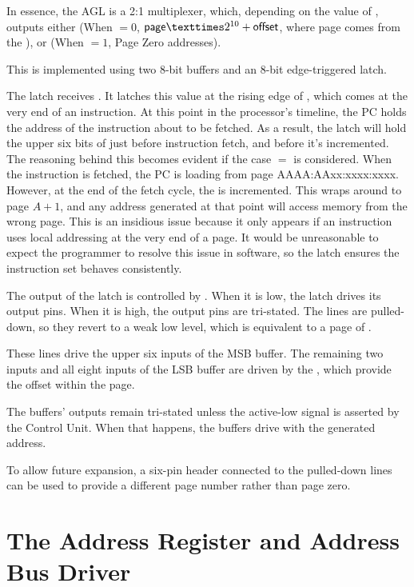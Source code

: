 In essence, the \gls{AGL} is a 2:1 multiplexer, which, depending on the value
of , outputs either  (When $ = 0$,
$\mbox{\textsf{page}} × 2^{10} + \mbox{\textsf{offset}}$, where \textsf{page} comes
from the \PC), or  (When $ = 1$, \gls{Page Zero}
addresses).

This is implemented using two  8-bit buffers and an  8-bit
edge-triggered latch.

The latch receives . It latches this value at the rising edge of
, which comes at the very end of an instruction. At this point in the
processor's timeline, the PC holds the address of the instruction about to be
fetched. As a result, the latch will hold the upper six bits of \PC{} just
before instruction fetch, and before it's incremented. The reasoning behind
this becomes evident if the case \PC$=$ is
considered. When the instruction is fetched, the PC is loading from page
{AAAA:AAxx:xxxx:xxxx}. However, at the end of the fetch cycle, the \PC{} is
incremented. This wraps around to page $A+1$, and any address generated at that
point will access memory from the wrong page. This is an insidious issue
because it only appears if an instruction uses local addressing at the very end
of a page. It would be unreasonable to expect the programmer to resolve this
issue in software, so the latch ensures the instruction set behaves
consistently.

The output of the latch is controlled by . When it is low, the latch
drives its output pins. When it is high, the output pins are tri-stated. The
lines are pulled-down, so they revert to a weak low level, which is equivalent
to a page of .

These lines drive the upper six inputs of the \gls{MSB} buffer. The remaining
two inputs and all eight inputs of the \gls{LSB} buffer are driven by the
, which provide the offset within the page.

The buffers' outputs remain tri-stated unless the  active-low signal
is asserted by the Control Unit. When that happens, the buffers drive \IBUS{}
with the generated address.

To allow future expansion, a six-pin header connected to the
pulled-down lines can be used to provide a different page number
rather than page zero.

\section{The Address Register and Address Bus Driver}

